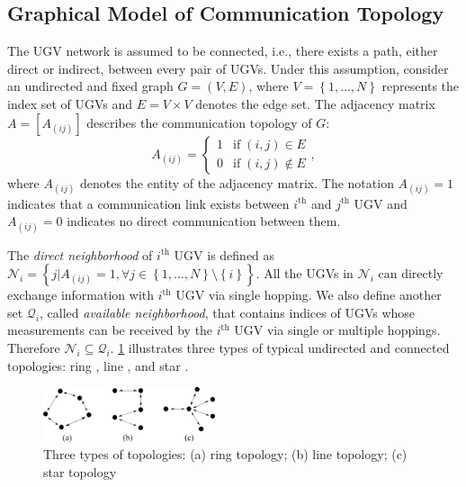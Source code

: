 \documentclass[journal]{IEEEtranTIE}
\theoremstyle{remark}
\begin{document}
	\subsection{Graphical Model of Communication Topology}
	The UGV network is assumed to be connected, i.e., there exists a path, either direct or indirect, between every pair of UGVs.
	Under this assumption, consider an undirected and fixed graph $G=(V,E)$, where $V=\left\lbrace 1,\dots,N\right\rbrace $ represents the index set of UGVs and $E=V\times V$ denotes the edge set. 
	The adjacency matrix $A=\left[ A_{(ij)}\right] $ describes the communication topology of $G$:
	\small\begin{equation*}
		A_{(ij)}=\begin{cases}
			1& \text{if}\;\left(i,j\right)\in E\\
			0& \text{if}\;\left(i,j\right)\notin E
		\end{cases},
	\end{equation*} \normalsize
	where $A_{(ij)}$ denotes the entity of the adjacency matrix. 
	The notation $A_{(ij)}=1$ indicates that a communication link exists between $i^\text{th}$ and $j^\text{th}$ UGV and $A_{(ij)}=0$ indicates no direct communication between them.
	
	The \textit{direct neighborhood} of $i^\text{th}$ UGV is defined as $\mathcal{N}_i=\left\lbrace j|A_{(ij)}=1,\forall j\in\left\lbrace1,\dots,N \right\rbrace \setminus \left\lbrace i \right\rbrace\right\rbrace $. 
	All the UGVs in $\mathcal{N}_i$ can directly exchange information with $i^\text{th}$ UGV via single hopping.  
	We also define another set $\mathcal{Q}_i$, called \textit{available neighborhood}, that contains indices of UGVs whose measurements can be received by the $i^\text{th}$ UGV via single or multiple hoppings.
	Therefore $\mathcal{N}_i\subseteq\mathcal{Q}_i$.
	\cref{fig:com_topo} illustrates three types of typical undirected and connected topologies: ring \cite{lawton2003decentralized}, line \cite{liu2010simple}, and star \cite{thatte2008sensor}. 
	
	\begin{figure}%
		\centering
		\includegraphics[width=0.45\textwidth]{com_topo_new_16-TIE-3798}
		\caption{Three types of topologies: (a) ring topology; (b) line topology; (c) star topology}
		\label{fig:com_topo}
	\end{figure}
	
\end{document}
